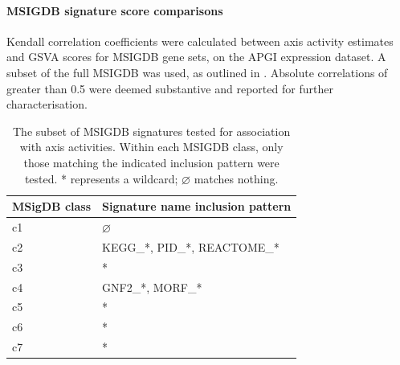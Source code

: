 \documentclass[dissertation.tex]{subfiles}
\begin{document}
\paragraph{\texorpdfstring{\acrshort{MSIGDB}}{MSigDB} signature score comparisons}
Kendall correlation coefficients were calculated between axis activity estimates and \gls{GSVA} scores for \gls{MSIGDB} gene sets, on the \gls{APGI} expression dataset.  A subset of the full \gls{MSIGDB} was used, as outlined in .  Absolute correlations of greater than 0.5 were deemed substantive and reported for further characterisation.

\begin{table}[!htbp]
\centering
\caption[Subset of \texorpdfstring{\acrshort{MSIGDB}}{MSigDB} signatures tested for association with axis activities]{The subset of \acrshort{MSIGDB} signatures tested for association with axis activities.  Within each \gls{MSIGDB} class, only those matching the indicated inclusion pattern were tested.  * represents a wildcard; $\varnothing$ matches nothing.}\label{sigs-msigdb-subset}
\begin{tabular}{@{}ll@{}}
\toprule
MSigDB class & Signature name inclusion pattern   \\ \midrule
c1           & $\varnothing$                      \\
c2           & KEGG\_*, PID\_*, REACTOME\_*       \\
c3           & *                                  \\
c4           & GNF2\_*, MORF\_*                   \\
c5           & *                                  \\
c6           & *                                  \\
c7           & *                                  \\ \bottomrule
\end{tabular}
\end{table}
\end{document}
